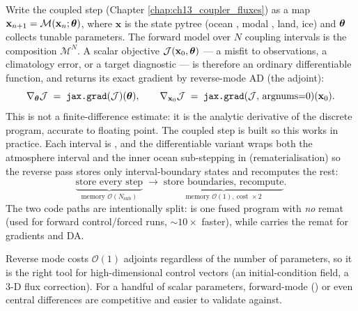 Write the coupled step (Chapter \ref{chap:ch13_coupler_fluxes}) as a map
$\mathbf{x}_{n+1} = \mathcal{M}(\mathbf{x}_n;\boldsymbol{\theta})$, where $\mathbf{x}$ is the
state pytree (ocean , \dino{} modal , land, ice)
and $\boldsymbol{\theta}$ collects tunable parameters. The forward model over $N$ coupling
intervals is the composition $\mathcal{M}^{N}$. A scalar objective
$\mathcal{J}(\mathbf{x}_0,\boldsymbol{\theta})$ --- a misfit to observations, a climatology error,
or a target diagnostic --- is therefore an ordinary differentiable function, and
\jax{} returns its exact gradient by reverse-mode AD (the adjoint):
\begin{equation}
  \nabla_{\boldsymbol{\theta}}\mathcal{J}
  \;=\; \texttt{jax.grad}(\mathcal{J})(\boldsymbol{\theta}),
  \qquad
  \nabla_{\mathbf{x}_0}\mathcal{J}
  \;=\; \texttt{jax.grad}(\mathcal{J},\,\mathrm{argnums}{=}0)(\mathbf{x}_0).
  \label{eq:adgrad}
\end{equation}
This is not a finite-difference estimate: it is the analytic derivative of the
discrete program, accurate to floating point. The coupled step is built so this
works in practice. Each interval is
,
and the differentiable variant  wraps both the atmosphere interval
and the inner ocean sub-stepping in  (rematerialisation) so
the reverse pass stores only interval-boundary states and recomputes the rest:
\begin{equation}
  \underbrace{\text{store every step}}_{\text{memory }\mathcal{O}(N_{\mathrm{sub}})}
  \;\longrightarrow\;
  \underbrace{\text{store boundaries, recompute}}_{\text{memory }\mathcal{O}(1),\ \text{cost }\times 2}.
  \label{eq:remat}
\end{equation}
The two code paths are intentionally split:  is one fused
 program with \emph{no} remat (used for forward control/forced runs,
$\sim 10\times$ faster), while  carries the remat for gradients and DA.

\begin{remark}
Reverse mode costs $\mathcal{O}(1)$ adjoints regardless of the number of
parameters, so it is the right tool for high-dimensional control vectors (an
initial-condition field, a 3-D flux correction). For a handful of scalar
parameters, forward-mode () or even central differences are
competitive and easier to validate against.
\end{remark}

